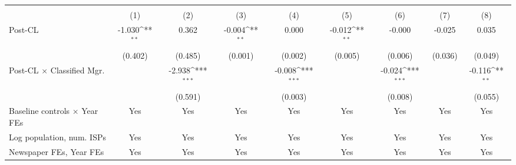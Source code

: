 {
\def\sym#1{\ifmmode^{#1}\else\(^{#1}\)\fi}
\begin{tabular}{l*{8}{c}}
\toprule
                    &&&&\\\cmidrule(lr){2-3}\cmidrule(lr){4-5}\cmidrule(lr){6-7}\cmidrule(lr){8-9}
                    &         &         &         &         &         &         &         &         \\
\midrule
Post-CL             &      -1.030\sym{**} &       0.362         &      -0.004\sym{**} &       0.000         &      -0.012\sym{**} &      -0.000         &      -0.025         &       0.035         \\
                    &     (0.402)         &     (0.485)         &     (0.001)         &     (0.002)         &     (0.005)         &     (0.006)         &     (0.036)         &     (0.049)         \\
\addlinespace
Post-CL $\times$ Classified Mgr.&                     &      -2.938\sym{***}&                     &      -0.008\sym{***}&                     &      -0.024\sym{***}&                     &      -0.116\sym{**} \\
                    &                     &     (0.591)         &                     &     (0.003)         &                     &     (0.008)         &                     &     (0.055)         \\
\addlinespace
Baseline controls $\times$ Year FEs &         Yes         &         Yes         &         Yes         &         Yes         &         Yes         &         Yes         &         Yes         &         Yes         \\
\addlinespace
Log population, num. ISPs &         Yes         &         Yes         &         Yes         &         Yes         &         Yes         &         Yes         &         Yes         &         Yes         \\
\addlinespace
Newspaper FEs, Year FEs &         Yes         &         Yes         &         Yes         &         Yes         &         Yes         &         Yes         &         Yes         &         Yes         \\

\end{tabular}}
